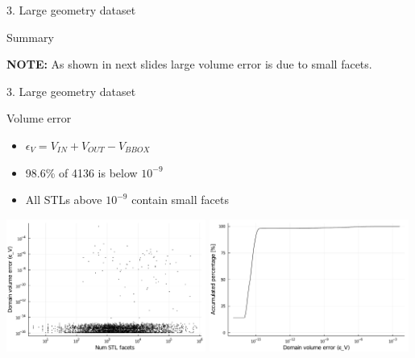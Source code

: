 \documentclass{beamer}
\begin{document}
\begin{frame}{3. Large geometry dataset}
  \begin{block}{Summary}

  \end{block}

  \vfill{}

  \textbf{NOTE:} As shown in next slides large volume error is due to small facets.

%
%
%
%
%
%
%
%
%
%
%

\end{frame}


\begin{frame}{3. Large geometry dataset}



  \begin{block}{Volume error}
  \begin{itemize}
    \item
      $\epsilon_V = V_{IN} + V_{OUT} - V_{BBOX}$
    \item
      98.6\% of 4136 is below $10^{-9}$
    \item
      All STLs above $10^{-9}$ contain small facets
  \end{itemize}
  \end{block}

  \includegraphics[width=0.49\textwidth]{../analysis/plots/num_stl_facets_volume_error}
  \includegraphics[width=0.49\textwidth]{../analysis/plots/histogram_volume_error}
\end{frame}
\end{document}
